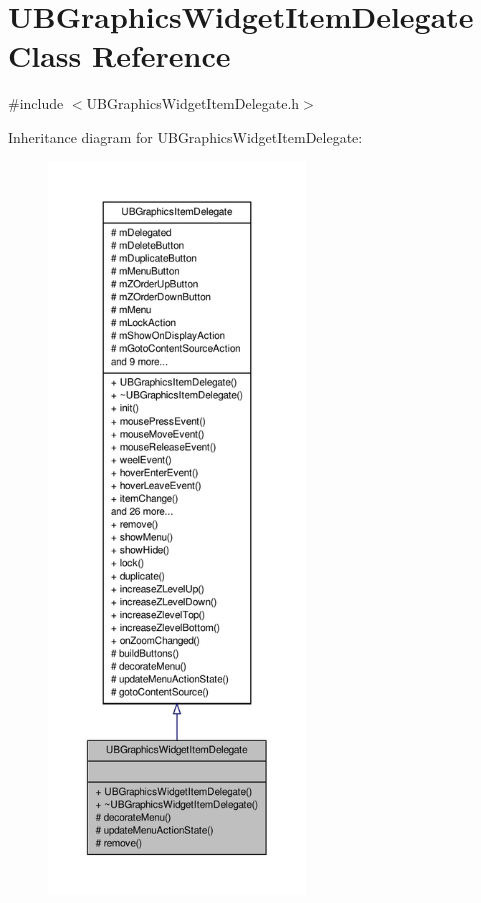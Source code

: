 \hypertarget{class_u_b_graphics_widget_item_delegate}{\section{U\-B\-Graphics\-Widget\-Item\-Delegate Class Reference}
\label{d8/d2c/class_u_b_graphics_widget_item_delegate}
}


{\ttfamily \#include $<$U\-B\-Graphics\-Widget\-Item\-Delegate.\-h$>$}



Inheritance diagram for U\-B\-Graphics\-Widget\-Item\-Delegate\-:
\nopagebreak
\begin{figure}[H]
\begin{center}
\leavevmode
\includegraphics[height=550pt]{d5/df5/class_u_b_graphics_widget_item_delegate__inherit__graph}
\end{center}
\end{figure}



